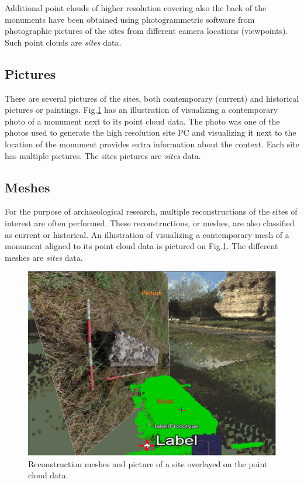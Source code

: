 Additional point clouds of higher resolution covering also the back of the
monuments have been obtained using photogrammetric software from photographic
pictures of the sites from different camera locations (viewpoints). Such point clouds are \textit{sites} data.

\subsection{Pictures}
There are several pictures of the sites, both contemporary (current) and historical pictures or paintings. Fig.\ref{fig:viaAppiaMeshPicture} has an illustration of visualizing
a contemporary photo of a monument next to its point cloud data. The photo was
one of the photos used to generate the high resolution site PC and visualizing
it next to the location of the monument provides extra information about the
context. Each site has multiple pictures. The sites pictures are \textit{sites} data.

\subsection{Meshes}
For the purpose of archaeological research, multiple reconstructions of the
sites of interest are often performed. These reconstructions, or meshes, are
also classified as current or historical. An illustration of visualizing a
contemporary mesh of a monument aligned to its point cloud data is pictured
on Fig.\ref{fig:viaAppiaMeshPicture}. The different meshes are \textit{sites} data.

\begin{figure}[!ht] \centering
\includegraphics[scale=0.5]{fig/conceptual_description/ViaAppiaMeshPicture.pdf}
\caption{Reconstruction meshes and picture of a site overlayed on the point
cloud data.} \label{fig:viaAppiaMeshPicture} \end{figure}

